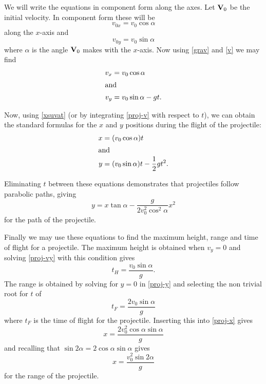 We will write the equations in component form along the axes. Let $\mathbf{V}_0$ be the initial velocity.
In component form these will be
\[
v_{0x} = v_0 \cos \alpha
\]
along the $x$-axis and
\[
v_{0y} = v_0 \sin \alpha
\]
where $\alpha$ is the angle $\mathbf{V}_0$ makes with the $x$-axis. Now using \eqref{grav}
and \eqref{v} we may find
\begin{subequations} \label{proj-v}
\begin{align}
v_x &= v_0 \cos \alpha \\
\shortintertext{and}
v_y &= v_0 \sin \alpha - gt . \label{proj-vy}
\end{align}
\end{subequations}

Now, using \eqref{xsuvat} (or by integrating \eqref{proj-v} with respect to $t$), we can obtain the 
standard formulas for the $x$ and $y$ positions during the flight of the projectile:
\begin{subequations}
\begin{align}
x &= (v_0 \cos \alpha) t \label{proj-x} \\
\shortintertext{and}
y &= (v_0 \sin \alpha) t - \frac{1}{2} g t^2 \label{proj-y} .
\end{align}
\end{subequations}

Eliminating $t$ between these equations demonstrates that projectiles follow parabolic
paths, giving
\begin{equation}
y = x \tan \alpha - \frac{g}{2v_0^2 \cos^2 \alpha} x^2
\end{equation}
for the path of the projectile.

Finally we may use these equations to find the maximum height, range and time of flight for a
projectile. The maximum height is obtained when $v_y = 0$ and solving \eqref{proj-vy} with this
condition gives
\begin{equation} \label{proj-height}
t_{H} = \frac{v_0 \sin \alpha}{g} .
\end{equation}
The range is obtained by solving for $y=0$ in \eqref{proj-y} and selecting the non trivial root for $t$
of
\begin{equation}
t_{F} = \frac{2 v_0 \sin \alpha}{g}
\end{equation}
where $t_{F}$ is the time of flight for the projectile. Inserting this into \eqref{proj-x} gives
\[
x = \frac{2 v_0^2 \cos \alpha \sin \alpha}{g}
\]
and recalling that $\sin 2 \alpha = 2 \cos \alpha \sin \alpha$ gives
\begin{equation}
x = \frac{v_0^2 \sin 2 \alpha}{g}
\end{equation}
for the range of the projectile.
